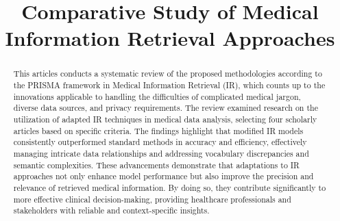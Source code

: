 \documentclass[conference]{IEEEtran}
\begin{document}
\title{Comparative Study of Medical Information Retrieval Approaches}

\graphicspath{ {./images/} }

\makeatletter
\newcommand{\linebreakand}{%
  \end{@IEEEauthorhalign}
  \hfill\mbox{}\par
  \mbox{}\hfill\begin{@IEEEauthorhalign}
}
\makeatother

\author{
    \and
    \and
}

\maketitle

\begin{abstract}
    This articles conducts a systematic review of the proposed methodologies according to the PRISMA framework in Medical Information Retrieval (IR), which counts up to the innovations applicable to handling the difficulties of complicated medical jargon, diverse data sources, and privacy requirements. The review examined research on the utilization of adapted IR techniques in medical data analysis, selecting four scholarly articles based on specific criteria. The findings highlight that modified IR models consistently outperformed standard methods in accuracy and efficiency, effectively managing intricate data relationships and addressing vocabulary discrepancies and semantic complexities. These advancements demonstrate that adaptations to IR approaches not only enhance model performance but also improve the precision and relevance of retrieved medical information. By doing so, they contribute significantly to more effective clinical decision-making, providing healthcare professionals and stakeholders with reliable and context-specific insights.
\end{abstract}
\end{document}
